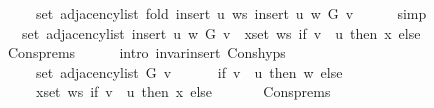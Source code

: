 \begin{isabellebody}
\ \ \ \ \ set\ {\isacharparenleft}{\kern0pt}adjacency{\isacharunderscore}{\kern0pt}list\ {\isacharparenleft}{\kern0pt}fold\ {\isacharparenleft}{\kern0pt}insert{\isacharprime}{\kern0pt}\ u{\isacharparenright}{\kern0pt}\ ws\ {\isacharparenleft}{\kern0pt}insert{\isacharprime}{\kern0pt}\ u\ w\ G{\isacharparenright}{\kern0pt}{\isacharparenright}{\kern0pt}\ v{\isacharparenright}{\kern0pt}{\isachardoublequoteclose}\isanewline
\ \ \ \ \isamarkupfalse%
\ simp\isanewline
\ \ \isamarkupfalse%
\ \isamarkupfalse%
\ {\isachardoublequoteopen}{\isachardot}{\kern0pt}{\isachardot}{\kern0pt}{\isachardot}{\kern0pt}\ {\isacharequal}{\kern0pt}\ set\ {\isacharparenleft}{\kern0pt}adjacency{\isacharunderscore}{\kern0pt}list\ {\isacharparenleft}{\kern0pt}insert{\isacharprime}{\kern0pt}\ u\ w\ G{\isacharparenright}{\kern0pt}\ v{\isacharparenright}{\kern0pt}\ {\isasymunion}\ {\isacharparenleft}{\kern0pt}{\isasymUnion}x{\isasymin}set\ ws{\isachardot}{\kern0pt}\ if\ v\ {\isacharequal}{\kern0pt}\ u\ then\ {\isacharbraceleft}{\kern0pt}x{\isacharbraceright}{\kern0pt}\ else\ {\isacharbraceleft}{\kern0pt}{\isacharbraceright}{\kern0pt}{\isacharparenright}{\kern0pt}{\isachardoublequoteclose}\isanewline
\ \ \ \ \isamarkupfalse%
\ Cons{\isachardot}{\kern0pt}prems\isanewline
\ \ \ \ \isamarkupfalse%
\ {\isacharparenleft}{\kern0pt}intro\ invar{\isacharunderscore}{\kern0pt}insert{\isacharprime}{\kern0pt}\ Cons{\isachardot}{\kern0pt}hyps{\isacharparenright}{\kern0pt}\isanewline
\ \ \isamarkupfalse%
\ \isamarkupfalse%
\isanewline
\ \ \ \ {\isachardoublequoteopen}{\isachardot}{\kern0pt}{\isachardot}{\kern0pt}{\isachardot}{\kern0pt}\ {\isacharequal}{\kern0pt}\isanewline
\ \ \ \ \ set\ {\isacharparenleft}{\kern0pt}adjacency{\isacharunderscore}{\kern0pt}list\ G\ v{\isacharparenright}{\kern0pt}\ {\isasymunion}\isanewline
\ \ \ \ \ {\isacharparenleft}{\kern0pt}if\ v\ {\isacharequal}{\kern0pt}\ u\ then\ {\isacharbraceleft}{\kern0pt}w{\isacharbraceright}{\kern0pt}\ else\ {\isacharbraceleft}{\kern0pt}{\isacharbraceright}{\kern0pt}{\isacharparenright}{\kern0pt}\ {\isasymunion}\isanewline
\ \ \ \ \ {\isacharparenleft}{\kern0pt}{\isasymUnion}x{\isasymin}set\ ws{\isachardot}{\kern0pt}\ if\ v\ {\isacharequal}{\kern0pt}\ u\ then\ {\isacharbraceleft}{\kern0pt}x{\isacharbraceright}{\kern0pt}\ else\ {\isacharbraceleft}{\kern0pt}{\isacharbraceright}{\kern0pt}{\isacharparenright}{\kern0pt}{\isachardoublequoteclose}\isanewline
\ \ \ \ \isamarkupfalse%
\ Cons{\isachardot}{\kern0pt}prems\isanewline

\end{isabellebody}
